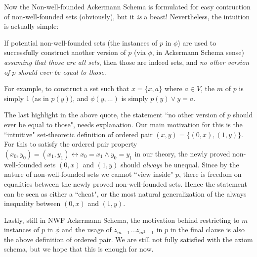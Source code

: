 \documentclass{article}
\begin{document}
Now the Non-well-founded Ackermann Schema is formulated for easy contruction of non-well-founded sets (obviously), but it \textit{is} a beast! Nevertheless, the intuition is actually simple:

\begin{displayquote}
If potential non-well-founded sets (the instances of $p$ in $\phi$) are used to successfully construct another version of $p$ (via $\phi$, in Ackermann Schema sense) \textit{assuming that those are all sets}, then those are indeed sets, and \textit{no other version of $p$ should ever be equal to those}.
\end{displayquote}

For example, to construct a set such that $x=\{x, a\}$ where $a \in V$, the $m$ of $p$ is simply 1 (as in $p(y)$), and $\phi(y, \ldots)$ is simply $p(y) \vee y = a$.

The last highlight in the above quote, the statement ``no other version of $p$ should ever be equal to those", needs explanation. Our main motivation for this is the ``intuitive" set-theoretic definition of ordered pair $(x,y) = \{(0,x), (1, y)\}$. For this to satisfy the ordered pair property $(x_0,y_0) = (x_1, y_1) \leftrightarrow x_0 = x_1 \wedge y_0 = y_1$ in our theory, the newly proved non-well-founded sets $(0,x)$ and $(1,y)$ should \textit{always} be unequal. Since by the nature of non-well-founded sets we cannot ``view inside" $p$, there is freedom on equalities between the newly proved non-well-founded sets. Hence the statement can be seen as either a ``cheat", or the most natural generalization of the always inequality between $(0,x)$ and $(1,y)$.

Lastly, still in NWF Ackermann Schema, the motivation behind restricting to $m$ instances of $p$ in $\phi$ and the usage of $z_{m-1} \ldots z_{m^2-1}$ in $p$ in the final clause is also the above definition of ordered pair. We are still not fully satisfied with the axiom schema, but we hope that this is enough for now.



\end{document}

